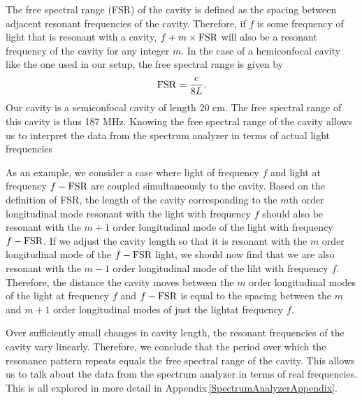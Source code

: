 The free spectral range (FSR) of the cavity is defined as the spacing between adjacent resonant frequencies of the cavity. Therefore, if $f$ is some frequency of light that is resonant with a cavity, $f+m\times \textnormal{FSR}$ will also be a resonant frequency of the cavity for any integer $m$. In the case of a hemiconfocal cavity like the one used in our setup, the free spectral range is given by 
\begin{equation}
    \textnormal{FSR}=\frac{c}{8L}.
\end{equation}
Our cavity is a semiconfocal cavity of length $20$ cm. The free spectral range of this cavity is thus 187 MHz. 
Knowing the free spectral range of the cavity allows us to interpret the data from the spectrum analyzer in terms of actual light frequencies

As an example, we consider a case where light of frequency $f$ and light at frequency $f-\textnormal{FSR}$ are coupled simultaneously to the cavity. Based on the definition of FSR, the length of the cavity corresponding to the $m$th order longitudinal mode resonant with the light with frequency $f$ should also be resonant with the $m+1$ order longitudinal mode of the light with frequency $f-\textnormal{FSR}$.
If we adjust the cavity length so that it is resonant with the $m$ order longitudinal mode of the $f-\textnormal{FSR}$ light, we should now find that we are also resonant with the $m-1$ order longitudinal mode of the liht with frequency $f$. Therefore, the distance the cavity moves between the $m$ order longitudinal modes of the light at frequency $f$ and $f-\textnormal{FSR}$ is equal to the spacing between the $m$ and $m+1$ order longitudinal modes of just the lightat frequency $f$.

Over sufficiently small changes in cavity length, the resonant frequencies of the cavity vary linearly. Therefore, we conclude that the period over which the resonance pattern repeats equals the free spectral range of the cavity. This allows us to talk about the data from the spectrum analyzer in terms of real frequencies. 
This is all explored in more detail in Appendix\,\ref{SpectrumAnalyzerAppendix}.

